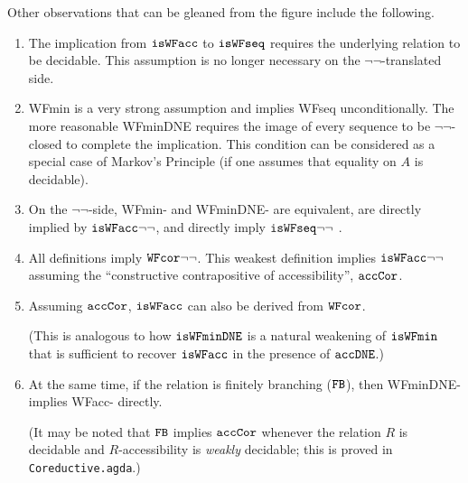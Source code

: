 Other observations that can be gleaned from the figure include the following.
\begin{enumerate}
  \item The implication from $\mathtt{isWFacc}$ to $\mathtt{isWFseq}$ requires the underlying relation to be decidable.
    This assumption is no longer necessary on the $\lnot\lnot$-translated side.
  \item WFmin is a very strong assumption and implies WFseq unconditionally.
  The more reasonable WFminDNE requires the image of every sequence to be $\lnot\lnot$-closed
  to complete the implication.  This condition can be considered as a special case of Markov's Principle
  (if one assumes that equality on $A$ is decidable).
  \item On the $\lnot\lnot$-side, WFmin- and WFminDNE- are equivalent, are directly implied by $\mathtt{isWFacc}{\lnot\lnot}$,
    and directly imply $\mathtt{isWFseq}{\lnot\lnot}$  .
  \item All definitions imply $\mathtt{WFcor}{\lnot\lnot}$.  This weakest definition implies $\mathtt{isWFacc}{\lnot\lnot}$ assuming the
    ``constructive contrapositive of accessibility'', $\mathtt{accCor}$.
  \item Assuming $\mathtt{accCor}$, $\mathtt{isWFacc}$ can also be derived from $\mathtt{WFcor}$. %

     (This is analogous to how $\mathtt{isWFminDNE}$ is a natural weakening of
    $\mathtt{isWFmin}$ that is sufficient to recover $\mathtt{isWFacc}$ in the presence of {$\mathtt{accDNE}$}.)

  \item At the same time, if the relation is finitely branching ($\mathtt{FB}$), then WFminDNE-
    implies WFacc- directly.

    (It may be noted that $\mathtt{FB}$ implies $\mathtt{accCor}$ whenever the relation $R$ is decidable
    and $R$-accessibility is \emph{weakly} decidable;  this is proved in \texttt{Coreductive.agda}.)


\end{enumerate}
